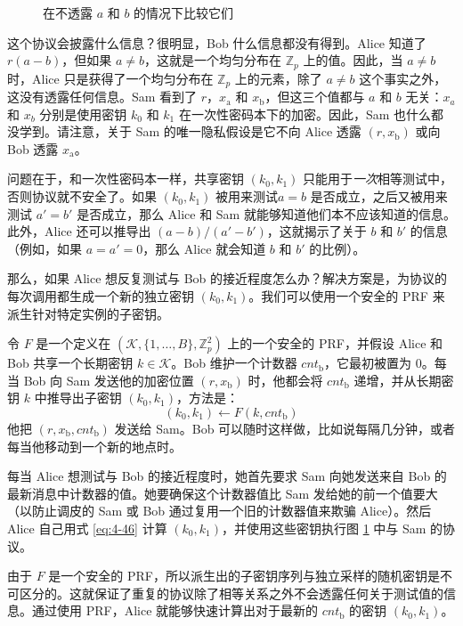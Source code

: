 \begin{figure}
  \centering
  
  \caption{在不透露 $a$ 和 $b$ 的情况下比较它们}
  \label{fig:4-17}
\end{figure}

这个协议会披露什么信息？很明显，Bob 什么信息都没有得到。Alice 知道了 $r(a-b)$，但如果 $a\neq b$，这就是一个均匀分布在 $\mathbb{Z}_p$ 上的值。因此，当 $a\neq b$时，Alice 只是获得了一个均匀分布在 $\mathbb{Z}_p$ 上的元素，除了 $a\neq b$ 这个事实之外，这没有透露任何信息。Sam 看到了 $r$，$x_\mathrm{a}$ 和 $x_\mathrm{b}$，但这三个值都与 $a$ 和 $b$ 无关：$x_a$ 和 $x_b$ 分别是使用密钥 $k_0$ 和 $k_1$ 在一次性密码本下的加密。因此，Sam 也什么都没学到。请注意，关于 Sam 的唯一隐私假设是它不向 Alice 透露 $(r,x_\mathrm{b})$ 或向 Bob 透露 $x_\mathrm{a}$。

\vspace{8pt}

问题在于，和一次性密码本一样，共享密钥 $(k_0,k_1)$ 只能用于\emph{一次}相等测试中，否则协议就不安全了。如果 $(k_0,k_1)$ 被用来测试$a=b$ 是否成立，之后又被用来测试 $a'=b'$ 是否成立，那么 Alice 和 Sam 就能够知道他们本不应该知道的信息。此外，Alice 还可以推导出 $(a-b)/(a'-b')$，这就揭示了关于 $b$ 和 $b'$ 的信息（例如，如果 $a=a'=0$，那么 Alice 就会知道 $b$ 和 $b'$ 的比例）。

\begin{snote}[子密钥的派生。]
那么，如果 Alice 想反复测试与 Bob 的接近程度怎么办？解决方案是，为协议的每次调用都生成一个新的独立密钥 $(k_0,k_1)$。我们可以使用一个安全的 PRF 来派生针对特定实例的子密钥。

令 $F$ 是一个定义在 $(\mathcal{K},\{1,\dots,B\},\mathbb{Z}^2_p)$ 上的一个安全的 PRF，并假设 Alice 和 Bob 共享一个长期密钥 $k\in\mathcal{K}$。Bob 维护一个计数器 $cnt_\mathrm{b}$，它最初被置为 $0$。每当 Bob 向 Sam 发送他的加密位置 $(r,x_\mathrm{b})$ 时，他都会将 $cnt_\mathrm{b}$ 递增，并从长期密钥 $k$ 中推导出子密钥 $(k_0,k_1)$，方法是：
\begin{equation}\label{eq:4-46}
(k_0,k_1)\leftarrow F(k,cnt_\mathrm{b})
\end{equation}
他把 $(r,x_\mathrm{b},cnt_\mathrm{b})$ 发送给 Sam。Bob 可以随时这样做，比如说每隔几分钟，或者每当他移动到一个新的地点时。

每当 Alice 想测试与 Bob 的接近程度时，她首先要求 Sam 向她发送来自 Bob 的最新消息中计数器的值。她要确保这个计数器值比 Sam 发给她的前一个值要大（以防止调皮的 Sam 或 Bob 通过复用一个旧的计数器值来欺骗 Alice）。然后 Alice 自己用式 \ref{eq:4-46} 计算 $(k_0,k_1)$，并使用这些密钥执行图 \ref{fig:4-17} 中与 Sam 的协议。

由于 $F$ 是一个安全的 PRF，所以派生出的子密钥序列与独立采样的随机密钥是不可区分的。这就保证了重复的协议除了相等关系之外不会透露任何关于测试值的信息。通过使用 PRF，Alice 就能够快速计算出对于最新的 $cnt_\mathrm{b}$ 的密钥 $(k_0,k_1)$。
\end{snote}